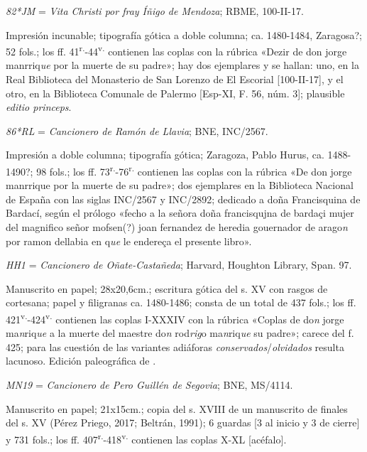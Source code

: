\documentclass[11pt,a4paper,twoside]{article}
\newcommand{\comillas}[1]{«#1»}
\newcommand{\tsup}[1]{\textsuperscript{#1}}
\begin{document}
\textit{82*JM} = \textit{Vita Christi por fray Íñigo de Mendoza}; RBME, 100-II-17.

Impresión incunable; tipografía gótica a doble columna; ca. 1480-1484, Zaragosa?; 52 fols.; los ff. 41\tsup{r.}-44\tsup{v.} contienen las coplas con la rúbrica \comillas{Dezir de don jorge manrriq\textit{ue} por la muerte de su padre}; hay dos ejemplares y se hallan: uno, en la Real Biblioteca del Monasterio de San Lorenzo de El Escorial [100-II-17], y el otro, en la Biblioteca Comunale de Palermo [Esp-XI, F. 56, núm. 3]; plausible \textit{editio princeps}.\vspace{5pt}

\textit{86*RL} = \textit{Cancionero de Ramón de Llavia}; BNE, INC/2567.

Impresión a doble columna; tipografía gótica; Zaragoza, Pablo Hurus, ca. 1488-1490?; 98 fols.; los ff. 73\tsup{r.}-76\tsup{r.} contienen las coplas con la rúbrica \comillas{De don jorge manrrique por la muerte de su padre}; dos ejemplares en la Biblioteca Nacional de España con las siglas INC/2567 y INC/2892; dedicado a doña Francisquina de Bardací, según el prólogo \comillas{fecho a la señora doña francisqujna de bardaçi mujer del magnifico señor mofsen(?) joan fernandez de heredia gouernador de arago\textit{n} por ramon dellabia en q\textit{ue} le endereça el presente libro}.\vspace{5pt}

\textit{HH1} = \textit{Cancionero de Oñate-Castañeda}; Harvard, Houghton Library, Span. 97.

Manuscrito en papel; 28x20,6cm.; escritura gótica del s. XV con rasgos de cortesana; papel y filigranas ca. 1480-1486; consta de un total de 437 fols.; los ff. 421\tsup{v.}-424\tsup{v.} contienen las coplas I-XXXIV con la rúbrica \comillas{Coplas de do\textit{n} jorge ma\textit{n}riq\textit{ue} a la muerte del maestre do\textit{n} rod\textit{rig}o ma\textit{n}riq\textit{ue} su padre}; carece del f. 425; para las cuestión de las variantes adiáforas \textit{conservados}/\textit{olvidados} resulta lacunoso. Edición paleográfica de \textcite{Severin1990}.\vspace{5pt} 

\textit{MN19} = \textit{Cancionero de Pero Guillén de Segovia}; BNE, MS/4114.

Manuscrito en papel; 21x15cm.; copia del s. XVIII de un manuscrito de finales del s. XV (Pérez Priego, 2017; Beltrán, 1991); 6 guardas [3 al inicio y 3 de cierre] y 731 fols.; los ff. 407\tsup{r.}-418\tsup{v.} contienen las coplas X-XL [acéfalo].\vspace{5pt}
\end{document}
